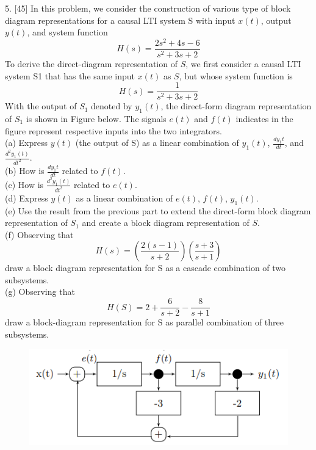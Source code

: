 \documentclass[12pt,a4paper]{article}
\begin{document}
\begin{tcolorbox}[colback = white]
5. [45]  In this problem, we consider the construction of various type of block diagram representations for a
causal LTI system S with input $x(t)$, output $y(t)$, and system function
$$
H(s)=\frac{2s^{2}+4s-6}{s^{2}+3s+2}
$$
To derive the direct-diagram representation of $S$, we first consider a causal LTI system S1 that has the same input $x(t)$ as $S$, but whose system function is
$$
H(s)=\frac{1}{s^{2}+3s+2}
$$
With the output of $S_{1}$ denoted by $y_{1}(t)$, the direct-form diagram representation of $S_{1}$ is shown in Figure below. The signals $e(t)$ and $f(t)$ indicates in the figure represent respective inputs into the two integrators.\\
(a) Express $y(t)$ (the output of S) as a linear combination of $y_{1}(t)$, $\frac{dy_{1}t}{dt}$, and $\frac{d^{2}y_{1}(t)}{dt^{2}}$.\\
(b) How is $\frac{dy_{1}t}{dt}$ related to $f(t)$.\\
(c) How is $\frac{d^{2}y_{1}(t)}{dt^{2}}$ related to $e(t)$.\\
(d) Express $y(t)$ as a linear combination of $e(t)$, $f(t)$, $y_{1}(t)$.\\
(e) Use the result from the previous part to extend the direct-form block diagram representation of $S_{1}$ and create a block diagram representation of $S$.\\
(f) Observing that
$$
H(s)=\left(\frac{2(s-1)}{s+2}\right)\left(\frac{s+3}{s+1}\right)
$$
draw a block diagram representation for S as a cascade combination of two subsystems.\\
(g) Observing that
$$
H(S)=2+\frac{6}{s+2}-\frac{8}{s+1}
$$
draw a block-diagram representation for S as parallel combination of three subsystems.
\begin{figure}[H]
	\centering
	\includegraphics{HW6P5.png}
	\label{fig:fig2} 
\end{figure}
\end{tcolorbox}
\end{document}
